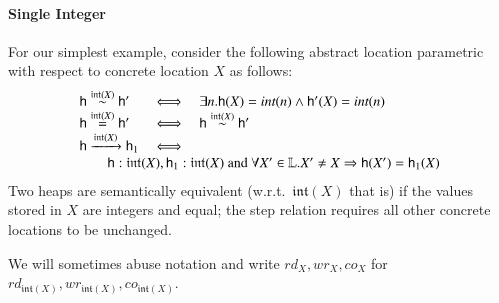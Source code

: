 \documentclass[nocopyrightspace,preprint]{sigplanconf}
\newcommand{\intt}[1]{\textit{int}(#1)}
\newcommand{\labs}{\mathbb{L}}
\newcommand{\rEff}[1]{\ensuremath{\mathit{rd}_{#1}}}
\newcommand{\cEff}[1]{\ensuremath{\mathit{co}_{#1}}}
\newcommand{\wEff}[1]{\ensuremath{\mathit{wr}_{#1}}}
\newcommand{\locInt}{\ensuremath{\mathfrak{int}}\xspace}
\newcommand{\cloc}{\ensuremath{X}\xspace}
\newcommand\heap{\ensuremath{\mathsf{h}}\xspace}
\newcommand\h{\heap}
\newcommand\inR[2]{\ensuremath{#1:#2}}
\newcommand\rloc[3]{\ensuremath{#1 \stackrel{#3}{\sim} #2}}
\newcommand\rrloc[3]{\ensuremath{#1 \stackrel{#3}{=} #2}}
\newcommand\gloc[3]{\ensuremath{#1 \xrightarrow{#3}#2}}
\begin{document}
\paragraph{Single Integer} For our simplest example, consider the following abstract location parametric with respect to concrete location $X$ as follows:
\[
\begin{array}{lcl}
 \rloc{\h}{\h'}{\locInt(\cloc)}
  &\iff& \exists n.\heap(X) = \intt n \land \heap'(X) = \intt n\\
\rrloc{\h}{\h'}{\locInt(\cloc)} &\iff&  \rloc{\h}{\h'}{\locInt(\cloc)}\\
  
  \gloc{\h}{\h_1}{\locInt (\cloc)} &\iff& \\ 
  \multicolumn{3}{r}{\qquad \inR{\heap}{\locInt(\cloc)}, \inR{\heap_1}{\locInt(\cloc)} \textrm{ and } \forall \cloc' \in \labs. \cloc' \neq X \Rightarrow \heap(\cloc') = \heap_1(\cloc)}

 \end{array}
\]
Two heaps are semantically equivalent (w.r.t.\ $\locInt(\cloc)$ that
is) if the values stored in $X$ are integers and equal; the step
relation requires all other concrete locations to be unchanged.

We will sometimes abuse notation and write $\rEff{\cloc}, \wEff{\cloc}, \cEff{\cloc}$ for $\rEff{\locInt(\cloc)}, \wEff{\locInt(\cloc)}, \cEff{\locInt(\cloc)}$. 
\end{document}
